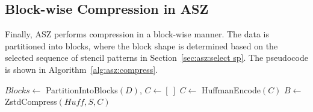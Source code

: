 


\subsection{Block-wise Compression in ASZ}\label{sec:asz:compress}

Finally, ASZ performs compression in a block-wise manner. The data is partitioned into blocks, where the block shape is determined based on the selected sequence of stencil patterns in Section~\ref{sec:asz:select sp}. The pseudocode is shown in Algorithm~\ref{alg:asz:compress}.

\begin{algorithm}[h]
\small
\caption{Compress}
\label{alg:asz:compress}
$Blocks \leftarrow$ PartitionIntoBlocks$(D)$, $C \leftarrow [\ ]$ \;
$C \leftarrow$ HuffmanEncode$(C)$\;
$B \leftarrow$ ZstdCompress$(Huff,S,C)$\;
\;
\end{algorithm}

